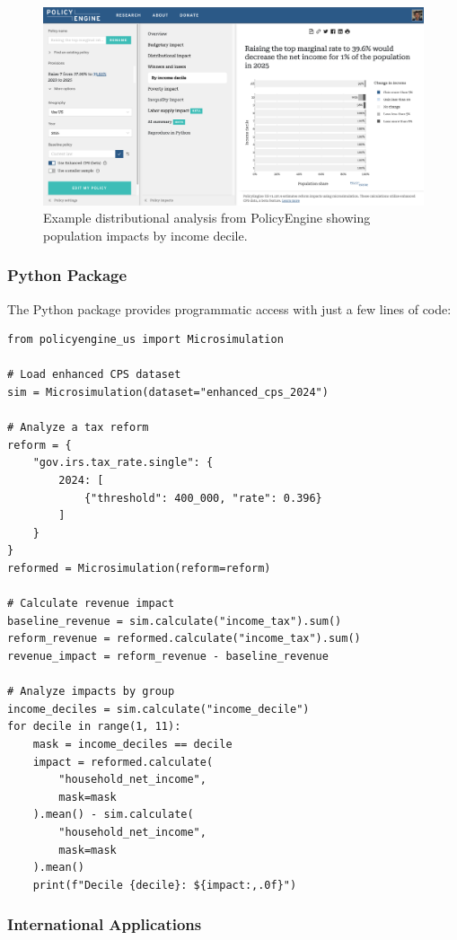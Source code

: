 \begin{figure}[h]
    \centering
    \includegraphics[width=\textwidth]{figures/policyengine_results.png}
    \caption{Example distributional analysis from PolicyEngine showing population impacts by income decile.}
    \label{fig:policyengine_results}
\end{figure}

\subsubsection{Python Package}

The Python package provides programmatic access with just a few lines of code:

\begin{verbatim}
from policyengine_us import Microsimulation

# Load enhanced CPS dataset
sim = Microsimulation(dataset="enhanced_cps_2024")

# Analyze a tax reform
reform = {
    "gov.irs.tax_rate.single": {
        2024: [
            {"threshold": 400_000, "rate": 0.396}
        ]
    }
}
reformed = Microsimulation(reform=reform)

# Calculate revenue impact
baseline_revenue = sim.calculate("income_tax").sum()
reform_revenue = reformed.calculate("income_tax").sum()
revenue_impact = reform_revenue - baseline_revenue

# Analyze impacts by group
income_deciles = sim.calculate("income_decile")
for decile in range(1, 11):
    mask = income_deciles == decile
    impact = reformed.calculate(
        "household_net_income",
        mask=mask
    ).mean() - sim.calculate(
        "household_net_income",
        mask=mask
    ).mean()
    print(f"Decile {decile}: ${impact:,.0f}")
\end{verbatim}

\subsubsection{International Applications}

